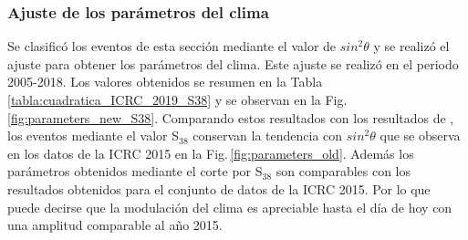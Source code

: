     \subsubsection{Ajuste de los parámetros del clima}
    Se clasificó los eventos de esta sección mediante el valor de $sin^2\theta$ y se realizó el ajuste para obtener los parámetros del clima. Este ajuste se realizó en el periodo 2005-2018. Los valores obtenidos se resumen en la Tabla\,\ref{tabla:cuadratica_ICRC_2019_S38} y se  observan en la Fig.\,\ref{fig:parameters_new_S38}. Comparando estos resultados con los resultados de \cite{aab2017impact}, los eventos mediante el valor S$_{38}$  conservan la tendencia con $sin^2\theta$ que se observa en los datos de la ICRC 2015 en la Fig.\,\ref{fig:parameters_old}. Además los parámetros obtenidos mediante el corte por S$_{38}$ son comparables con los resultados obtenidos para el conjunto de datos de la ICRC 2015. Por lo que puede decirse que la modulación del clima es apreciable  hasta el día de hoy con una amplitud comparable al año 2015.

